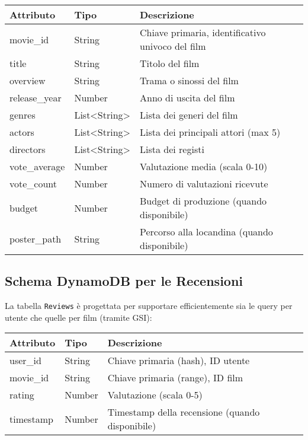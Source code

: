 \documentclass[11pt,a4paper]{article}
\begin{document}
\begin{center}
\begin{tabular}{lll}
\toprule
\textbf{Attributo} & \textbf{Tipo} & \textbf{Descrizione} \\
\midrule
movie\_id & String & Chiave primaria, identificativo univoco del film \\
title & String & Titolo del film \\
overview & String & Trama o sinossi del film \\
release\_year & Number & Anno di uscita del film \\
genres & List<String> & Lista dei generi del film \\
actors & List<String> & Lista dei principali attori (max 5) \\
directors & List<String> & Lista dei registi \\
vote\_average & Number & Valutazione media (scala 0-10) \\
vote\_count & Number & Numero di valutazioni ricevute \\
budget & Number & Budget di produzione (quando disponibile) \\
poster\_path & String & Percorso alla locandina (quando disponibile) \\
\bottomrule
\end{tabular}
\end{center}

\subsection{Schema DynamoDB per le Recensioni}
La tabella \texttt{Reviews} è progettata per supportare efficientemente sia le query per utente che quelle per film (tramite GSI):

\begin{center}
\begin{tabular}{lll}
\toprule
\textbf{Attributo} & \textbf{Tipo} & \textbf{Descrizione} \\
\midrule
user\_id & String & Chiave primaria (hash), ID utente \\
movie\_id & String & Chiave primaria (range), ID film \\
rating & Number & Valutazione (scala 0-5) \\
timestamp & Number & Timestamp della recensione (quando disponibile) \\
\bottomrule
\end{tabular}
\end{center}
\end{document}
